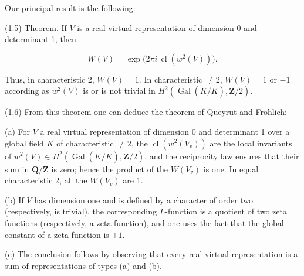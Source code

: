 \documentclass[9pt,twoside]{extarticle}
\begin{document}
{Our principal result is the following:\par

(1.5) Theorem. If \(V\) is a real virtual representation of dimension 0 and determinant 1, then\par

\[
W(V)=\exp\bigl(2\pi i\,\operatorname{cl}(w^2(V))\bigr).
\]

Thus, in characteristic 2, \(W(V)=1\). In characteristic \(\ne2\), \(W(V)=1\) or \(-1\) according as \(w^2(V)\) is or is not trivial in \(H^2(\operatorname{Gal}(\bar K/K),\mathbf Z/2)\).\par

(1.6) From this theorem one can deduce the theorem of Queyrut and Fröhlich:\par

(a) For \(V\) a real virtual representation of dimension 0 and determinant 1 over a global field \(K\) of characteristic \(\ne2\), the \(\operatorname{cl}(w^2(V_v))\) are the local invariants of \(w^2(V)\in H^2(\operatorname{Gal}(\bar K/K),\mathbf Z/2)\), and the reciprocity law ensures that their sum in \(\mathbf Q/\mathbf Z\) is zero; hence the product of the \(W(V_v)\) is one. In equal characteristic 2, all the \(W(V_v)\) are 1.\par

(b) If \(V\) has dimension one and is defined by a character of order two (respectively, is trivial), the corresponding \(L\)-function is a quotient of two zeta functions (respectively, a zeta function), and one uses the fact that the global constant of a zeta function is \(+1\).\par

(c) The conclusion follows by observing that every real virtual representation is a sum of representations of types (a) and (b).\par
}
\end{document}
